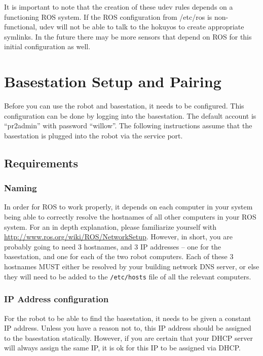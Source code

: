 It is important to note that the creation of these udev rules depends
on a functioning ROS system.  If the ROS configuration from /etc/ros
is non-functional, udev will not be able to talk to the hokuyos to
create appropriate symlinks.  In the future there may be more sensors
that depend on ROS for this initial configuration as well.

\section{Basestation Setup and Pairing}
Before you can use the robot and basestation, it needs to be
configured.  This configuration can be done by logging into the
basestation.  The default account is ``pr2admin'' with password
``willow''.  The following instructions assume that the basestation is
plugged into the robot via the service port.

\subsection{Requirements}

\subsubsection{Naming}
In order for ROS to work properly, it depends on each computer in your
system being able to correctly resolve the hostnames of all other
computers in your ROS system.  For an in depth explanation, please
familiarize yourself with
\href{http://www.ros.org/wiki/ROS/NetworkSetup}{http://www.ros.org/wiki/ROS/NetworkSetup}.
However, in short, you are probably going to need 3 hostnames, and 3
IP addresses -- one for the basestation, and one for each of the two
robot computers.  Each of these 3 hostnames MUST either be resolved by
your building network DNS server, or else they will need to be added
to the \texttt{/etc/hosts} file of all the relevant computers.

\subsubsection{IP Address configuration}
For the robot to be able to find the basestation, it needs to be given
a constant IP address.  Unless you have a reason not to, this IP
address should be assigned to the basestation statically.  However, if
you are certain that your DHCP server will always assign the same IP,
it is ok for this IP to be assigned via DHCP.

